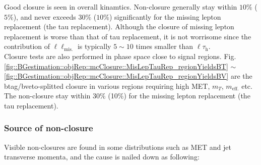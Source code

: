 Good closure is seen in overall kinamtics. Non-closure generally stay within $10\%$ ($5\%$), and never exceeds $30\%$ ($10\%$) significantly for the missing lepton replacement (the tau replacement).
Although the closure of missing lepton replacement is worse than that of tau replacement, it is not worrisome since the contribution of $\ell\ell_{\mathrm{mis.}}$ is typically $5\sim10$ times smaller than $\ell\tau_{\mathrm{h}}$. \\

Closure tests are also performed in phase space close to signal regions. 
Fig. \ref{fig::BGestimation::objRep::mcClosure::MisLepTauRep_regionYieldsBT} $\sim$ \ref{fig::BGestimation::objRep::mcClosure::MisLepTauRep_regionYieldsBV} 
are the btag/bveto-splitted closure in various regions requiring high MET, $m_{T}$, $m_{\mathrm{eff.}}$ etc. The non-closure stay within 30$\%$ (10$\%$) for the missing lepton replacement (the tau replacement).\\





%
%
%
%




\clearpage
\subsubsection{Source of non-closure} \label{sec::BGestimation::objRep::NonClosure} 
Visible non-closures are found in some distributions such as MET and jet transverse momenta, and the cause is nailed down as following:

